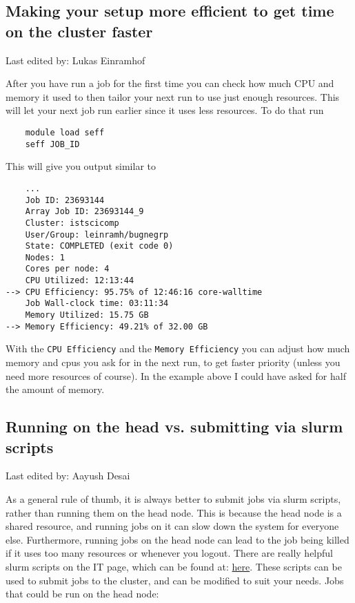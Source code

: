 \documentclass{article}
\newcommand{\setlasteditor}[1]{\gdef\lasteditor{#1}}
\newcommand{\lastedited}{%
    \vspace{1mm} {\footnotesize Last edited by: \lasteditor} \vspace{3mm}
    \newline

}
\begin{document}
\subsection{Making your setup more efficient to get time on the cluster faster}
\setlasteditor{Lukas Einramhof}
\lastedited
After you have run a job for the first time you can check how much CPU and memory it used to then tailor your next run to use just enough resources. This will let your next job run earlier since it uses less resources.
To do that run
\begin{verbatim}
    module load seff
    seff JOB_ID
\end{verbatim}
This will give you output similar to
\begin{verbatim}
    ...
    Job ID: 23693144
    Array Job ID: 23693144_9
    Cluster: istscicomp
    User/Group: leinramh/bugnegrp
    State: COMPLETED (exit code 0)
    Nodes: 1
    Cores per node: 4
    CPU Utilized: 12:13:44
--> CPU Efficiency: 95.75% of 12:46:16 core-walltime
    Job Wall-clock time: 03:11:34
    Memory Utilized: 15.75 GB
--> Memory Efficiency: 49.21% of 32.00 GB
\end{verbatim}
With the \texttt{CPU Efficiency} and the \texttt{Memory Efficiency} you can adjust how much memory and cpus you ask for in the next run, to get faster priority (unless you need more resources of course).
In the example above I could have asked for half the amount of memory.

\subsection{Running on the head vs. submitting via slurm scripts}
\setlasteditor{Aayush Desai}
\lastedited
As a general rule of thumb, it is always better to submit jobs via slurm scripts, rather than running them on the head node. This is because the head node is a shared resource, and running jobs on it can slow down the system for everyone else. Furthermore, running jobs on the head node can lead to the job being killed if it uses too many resources or whenever you logout. 
\newline
\newline
There are really helpful slurm scripts on the IT page, which can be found at: \href{https://it.pages.ist.ac.at/docs/hpc-cluster/hpc-handbook/composing-a-slurm-script/}{here}. These scripts can be used to submit jobs to the cluster, and can be modified to suit your needs.
\newpage
Jobs that could be run on the head node:
\end{document}
